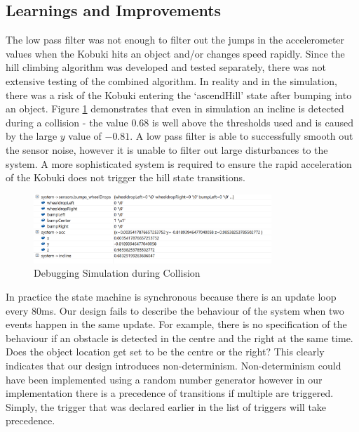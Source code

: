 \subsection{Learnings and Improvements}
The low pass filter was not enough to filter out the jumps in the accelerometer values when the Kobuki hits an object and/or changes speed rapidly. Since the hill climbing algorithm was developed and tested separately, there was not extensive testing of the combined algorithm. In reality and in the simulation, there was a risk of the Kobuki entering the `ascendHill' state after bumping into an object. Figure \ref{fig:debug_incline} demonstrates that even in simulation an incline is detected during a collision - the value $0.68$ is well above the thresholds used and is caused by the large $y$ value of $-0.81$. A low pass filter is able to successfully smooth out the sensor noise, however it is unable to filter out large disturbances to the system. A more sophisticated system is required to ensure the rapid acceleration of the Kobuki does not trigger the hill state transitions.
\begin{figure}[H]
    \centering
    \includegraphics[width=0.8\textwidth]{Images/debug_incline}
    \caption{Debugging Simulation during Collision}
    \label{fig:debug_incline}
\end{figure}

In practice the state machine is synchronous because there is an update loop every 80ms. Our design fails to describe the behaviour of the system when two events happen in the same update. For example, there is no specification of the behaviour if an obstacle is detected in the centre and the right at the same time. Does the object location get set to be the centre or the right? This clearly indicates that our design introduces non-determinism. Non-determinism could have been implemented using a random number generator however in our implementation there is a precedence of transitions if multiple are triggered. Simply, the trigger that was declared earlier in the list of triggers will take precedence.
